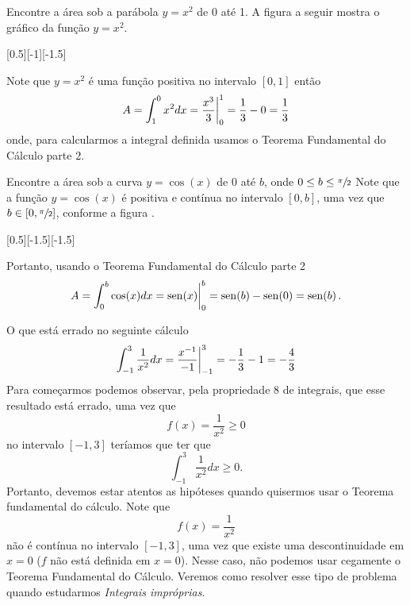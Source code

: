 \begin{example}
  Encontre a área sob a parábola $y=x^2$ de 0 até 1.
  \solution
  A figura a seguir mostra o gráfico da função $y=x^2$.

  [0.5][-1][-1.5]

  Note que $y=x^2$ é uma função positiva no intervalo $[0, 1]$
  então
  \[
    A
    = \int^{0}_{1} x^2 dx
    = \frac{x^3}{3} \bigg\rvert_{0}^{1}
    = \frac{1}{3}-0
    = \frac{1}{3}
  \]
  onde, para calcularmos a integral definida usamos o
  Teorema Fundamental do Cálculo parte 2.
\end{example}

\begin{example}
  Encontre a área sob a curva $y=\cos(x) $ de $0$ até $b$, onde
  \(0 \leq b \leq \sfrac{\pi}{2}\)
  \solution
  Note que a função $y=\cos(x)$ é positiva e contínua no intervalo $[0, b]$,
  uma vez que \(b \in \left[0, \sfrac{\pi}{2}\right]\), conforme a figura .

  [0.5][-1.5][-1.5]

  Portanto, usando o Teorema Fundamental do Cálculo parte 2
  \[
    A
    = \int_0^b \cos(x) dx
    = \operatorname{sen}(x) \bigg\rvert_{0}^{b}
    = \operatorname{sen}(b) - \operatorname{sen}(0)
    = \operatorname{sen}(b) \,.
  \]
\end{example}

\begin{example}
  O que está errado no seguinte cálculo
  \[
    \int_{-1}^3 \frac{1}{x^2} dx
    = \frac{x^{-1}}{-1} \bigg\rvert_{-1}^{3}
    = - \frac{1}{3} - 1
    = - \frac{4}{3}
  \]
  \solution
  Para começarmos podemos observar, pela propriedade 8 de integrais, que esse
  resultado está errado, uma vez que
  \[
    f(x) = \frac{1}{x^2} \geq 0
  \]
  no intervalo
  $[-1, 3]$ teríamos que ter que
  \[
    \int_{-1}^3 \frac{1}{x^2} dx \geq 0.
  \]
  Portanto, devemos estar atentos as hipóteses quando quisermos usar o Teorema
  fundamental do cálculo. Note que
  \[
    f(x)=\frac{1}{x^2}
  \]
  não é contínua no intervalo $[-1, 3]$, uma vez que existe uma descontinuidade
  em $x=0$ ($f$ não está definida em $x=0$).
  Nesse caso, não podemos usar cegamente o Teorema
  Fundamental do Cálculo. Veremos como resolver esse tipo de problema quando
  estudarmos \emph{Integrais impróprias}.
\end{example}

